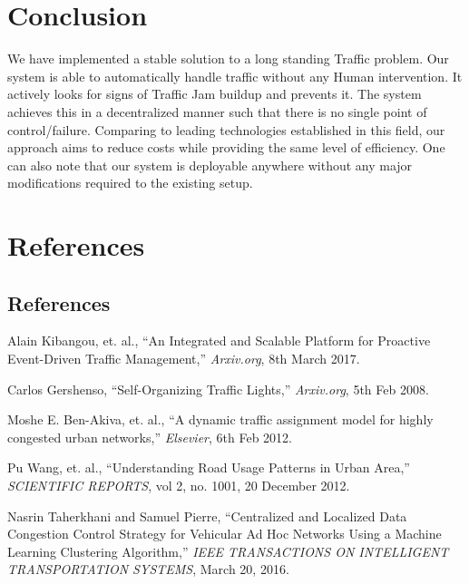\documentclass[12pt,a4paper,final]{report}
\DeclareRobustCommand{\gobblefive}[5]{}
\newcommand*{\SkipTocEntry}{\addtocontents{toc}{\gobblefive}}
\begin{document}
\chapter{Conclusion}
\thispagestyle{empty}
\newpage
We have implemented a stable solution to a long standing Traffic problem. Our system is able to automatically handle traffic without any Human intervention. It actively looks for signs of Traffic Jam buildup and prevents it. The system achieves this in a decentralized manner such that there is no single point of control/failure. Comparing to leading technologies established in this field, our approach aims to reduce costs while providing the same level of efficiency. One can also note that our system is deployable anywhere without any major modifications required to the existing setup.
\newpage
{}
\SkipTocEntry\chapter{References}
\thispagestyle{empty}
\newpage
\section*{References}
\begin{enumerate}[label={[\arabic*]}]
\item Alain Kibangou, et. al., “An Integrated and Scalable Platform for
 Proactive Event-Driven Traffic Management,” \textit{Arxiv.org}, 8th March 2017.

\item Carlos Gershenso, “Self-Organizing Traffic Lights,” \textit{Arxiv.org},
 5th Feb 2008.

\item Moshe E. Ben-Akiva, et. al., “A dynamic traffic assignment model
 for highly congested urban networks,” \textit{Elsevier}, 6th Feb 2012.

\item Pu Wang, et. al., “Understanding Road Usage Patterns in Urban
 Area,” \textit{SCIENTIFIC REPORTS}, vol 2, no. 1001, 20 December 2012.

\item Nasrin Taherkhani and Samuel Pierre, “Centralized and Localized
 Data Congestion Control Strategy for Vehicular Ad Hoc Networks Using
 a Machine Learning Clustering Algorithm,” \textit{IEEE TRANSACTIONS ON
 INTELLIGENT TRANSPORTATION SYSTEMS}, March 20, 2016.

\end{enumerate}
\newpage
\end{document}
